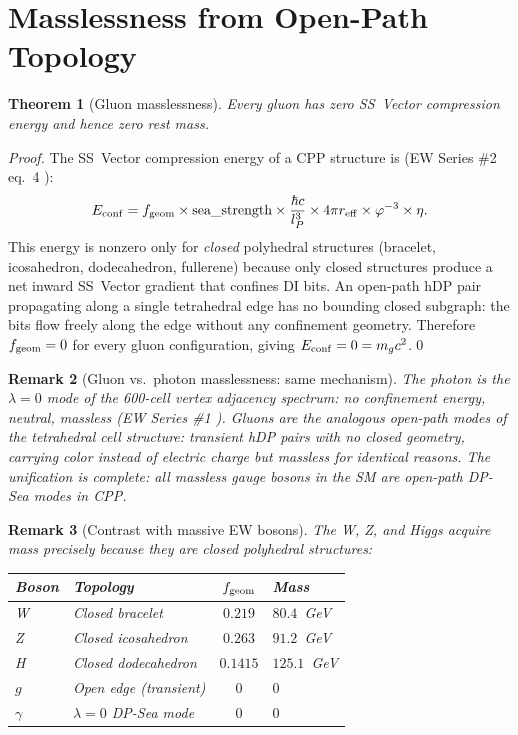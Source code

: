 \documentclass[11pt,a4paper]{article}
\newtheorem{theorem}{Theorem}[section]
\newtheorem{remark}[theorem]{Remark}
\newcommand{\lP}{l_P}
\newcommand{\phig}{\varphi}
\begin{document}
\section{Masslessness from Open-Path Topology}

\begin{theorem}[Gluon masslessness]
\label{thm:massless}
Every gluon has zero SS~Vector compression energy and hence zero
rest mass.
\end{theorem}

\begin{proof}
The SS~Vector compression energy of a CPP structure is
(EW Series \#2 eq.~4 \citep{cpp_ew2}):
\begin{equation}
E_{\rm conf}
= f_{\rm geom} \times \text{sea\_strength}
  \times \frac{\hbar c}{\lP^3}
  \times 4\pi r_{\rm eff}
  \times \phig^{-3} \times \eta.
\label{eq:econf}
\end{equation}
This energy is nonzero only for \emph{closed} polyhedral
structures (bracelet, icosahedron, dodecahedron, fullerene) because
only closed structures produce a net inward SS~Vector gradient that
confines DI bits.  An open-path hDP pair propagating along a single
tetrahedral edge has no bounding closed subgraph: the bits flow
freely along the edge without any confinement geometry.  Therefore
$f_{\rm geom} = 0$ for every gluon configuration, giving
$E_{\rm conf} = 0 = m_g c^2$.\qed
\end{proof}

\begin{remark}[Gluon vs.\ photon masslessness: same mechanism]
The photon is the $\lambda = 0$ mode of the 600-cell vertex
adjacency spectrum: no confinement energy, neutral, massless
(EW Series \#1 \citep{cpp_ew1}).  Gluons are the analogous
open-path modes of the \emph{tetrahedral cell} structure:
transient hDP pairs with no closed geometry, carrying color
instead of electric charge but massless for identical reasons.
The unification is complete: \emph{all massless gauge bosons in
the SM are open-path DP-Sea modes in CPP.}
\end{remark}

\begin{remark}[Contrast with massive EW bosons]
The W, Z, and Higgs acquire mass precisely because they are closed
polyhedral structures:
\begin{center}
\begin{tabular}{@{}llcl@{}}
\toprule
Boson & Topology & $f_{\rm geom}$ & Mass \\
\midrule
W & Closed bracelet & $0.219$ & $80.4$~GeV \\
Z & Closed icosahedron & $0.263$ & $91.2$~GeV \\
H & Closed dodecahedron & $0.1415$ & $125.1$~GeV \\
$g$ & Open edge (transient) & $0$ & $0$ \\
$\gamma$ & $\lambda=0$ DP-Sea mode & $0$ & $0$ \\
\bottomrule
\end{tabular}
\end{center}
\end{remark}
\end{document}
